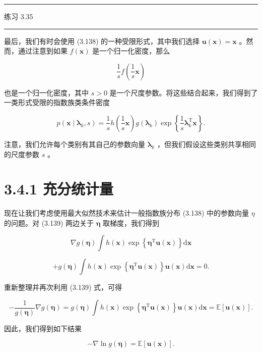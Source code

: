 \documentclass[10pt]{report}
\newcommand{\HRule}{\begin{center}\rule{0.9\linewidth}{0.2mm}\end{center}}
\begin{document}
\HRule

练习 3.35

\HRule

最后，我们有时会使用 (3.138) 的一种受限形式，其中我们选择 \(\mathbf{u}\left( \mathbf{x}\right)  = \mathbf{x}\) 。然而，通过注意到如果 \(f\left( \mathbf{x}\right)\) 是一个归一化密度，那么

\[
\frac{1}{s}f\left( {\frac{1}{s}\mathbf{x}}\right)  \tag{3.168}
\]

也是一个归一化密度，其中 \(s > 0\) 是一个尺度参数。将这些结合起来，我们得到了一类形式受限的指数族类条件密度

\[
p\left( {\mathbf{x} \mid  {\mathbf{\lambda }}_{k},s}\right)  = \frac{1}{s}h\left( {\frac{1}{s}\mathbf{x}}\right) g\left( {\mathbf{\lambda }}_{k}\right) \exp \left\{  {\frac{1}{s}{\mathbf{\lambda }}_{k}^{\mathrm{T}}\mathbf{x}}\right\}  . \tag{3.169}
\]

注意，我们允许每个类别有其自己的参数向量 \({\mathbf{\lambda }}_{k}\) ，但我们假设这些类别共享相同的尺度参数 \(s\) 。

\section*{3.4.1 充分统计量}

现在让我们考虑使用最大似然技术来估计一般指数族分布 (3.138) 中的参数向量 \(\eta\) 的问题。对 (3.139) 两边关于 \(\mathbf{\eta }\) 取梯度，我们得到

\[
\nabla g\left( \mathbf{\eta }\right) \int h\left( \mathbf{x}\right) \exp \left\{  {{\mathbf{\eta }}^{\mathrm{T}}\mathbf{u}\left( \mathbf{x}\right) }\right\}  \mathrm{d}\mathbf{x}
\]

\[
+ g\left( \mathbf{\eta }\right) \int h\left( \mathbf{x}\right) \exp \left\{  {{\mathbf{\eta }}^{\mathrm{T}}\mathbf{u}\left( \mathbf{x}\right) }\right\}  \mathbf{u}\left( \mathbf{x}\right) \mathrm{d}\mathbf{x} = 0. \tag{3.170}
\]

重新整理并再次利用 (3.139) 式，可得

\[
- \frac{1}{g\left( \mathbf{\eta }\right) }\nabla g\left( \mathbf{\eta }\right)  = g\left( \mathbf{\eta }\right) \int h\left( \mathbf{x}\right) \exp \left\{  {{\mathbf{\eta }}^{\mathrm{T}}\mathbf{u}\left( \mathbf{x}\right) }\right\}  \mathbf{u}\left( \mathbf{x}\right) \mathrm{d}\mathbf{x} = \mathbb{E}\left\lbrack  {\mathbf{u}\left( \mathbf{x}\right) }\right\rbrack  . \tag{3.171}
\]

因此，我们得到如下结果

\[
- \nabla \ln g\left( \mathbf{\eta }\right)  = \mathbb{E}\left\lbrack  {\mathbf{u}\left( \mathbf{x}\right) }\right\rbrack  . \tag{3.172}
\]
\end{document}
